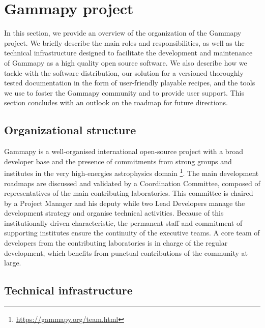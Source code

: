 \section{Gammapy project}
\label{sec:gammapy-project}

In this section, we provide an overview of the organization of the Gammapy project. We briefly describe the main roles and responsibilities, as well as the technical infrastructure designed to facilitate the development and maintenance of Gammapy as a high quality open source software. We also describe how we tackle with the software distribution, our solution for a versioned thoroughly tested documentation in the form of user-friendly playable recipes, and the tools we use to foster the Gammapy community and to provide user support. This section concludes with an outlook on the roadmap for future directions.

\subsection{Organizational structure}
\label{ssec:organizational-structure}

Gammapy is a well-organised international open-source project with a broad developer base and the presence of commitments from strong groups and institutes in the very high-energies astrophysics domain \footnote{\url{https://gammapy.org/team.html}}. The main development roadmaps are discussed and validated by a Coordination Committee, composed of representatives of the main contributing laboratories. This committee is chaired by a Project Manager and his deputy while two Lead Developers manage the development strategy and organise technical activities. Because of this institutionally driven characteristic, the permanent staff and commitment of supporting institutes ensure the continuity of the executive teams. A core team of developers from the contributing laboratories is in charge of the regular development, which benefits from punctual contributions of the community at large.

\subsection{Technical infrastructure}
\label{ssec:technical-infrastructure}

